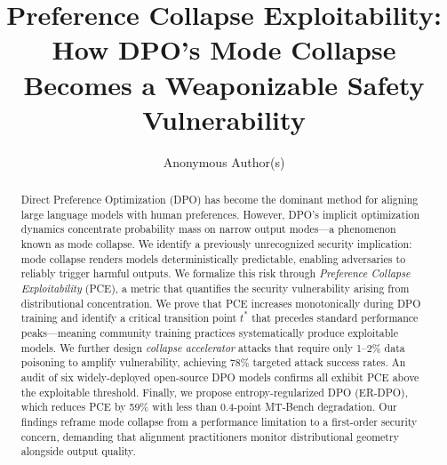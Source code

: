 \documentclass{article}
\title{Preference Collapse Exploitability: How DPO's Mode Collapse Becomes a Weaponizable Safety Vulnerability}
\author{
  Anonymous Author(s)
}
\theoremstyle{remark}
\begin{document}
\maketitle

\begin{abstract}
Direct Preference Optimization (DPO) has become the dominant method for aligning large language models with human preferences. However, DPO's implicit optimization dynamics concentrate probability mass on narrow output modes---a phenomenon known as mode collapse. We identify a previously unrecognized security implication: mode collapse renders models deterministically predictable, enabling adversaries to reliably trigger harmful outputs. We formalize this risk through \textit{Preference Collapse Exploitability} (PCE), a metric that quantifies the security vulnerability arising from distributional concentration. We prove that PCE increases monotonically during DPO training and identify a critical transition point $t^*$ that precedes standard performance peaks---meaning community training practices systematically produce exploitable models. We further design \textit{collapse accelerator} attacks that require only 1--2\% data poisoning to amplify vulnerability, achieving 78\% targeted attack success rates. An audit of six widely-deployed open-source DPO models confirms all exhibit PCE above the exploitable threshold. Finally, we propose entropy-regularized DPO (ER-DPO), which reduces PCE by 59\% with less than 0.4-point MT-Bench degradation. Our findings reframe mode collapse from a performance limitation to a first-order security concern, demanding that alignment practitioners monitor distributional geometry alongside output quality.
\end{abstract}















\end{document}
